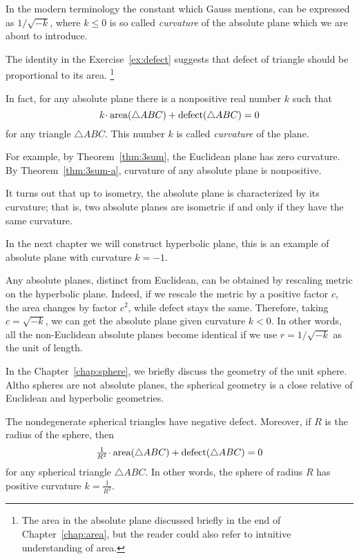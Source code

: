 In the modern terminology the constant which Gauss mentions, 
can be expressed as $1/\sqrt{-k}$, 
where $k\le 0$ is so called \emph{curvature} of the absolute plane which we are about to introduce.

The identity in the Exercise~\ref{ex:defect}
suggests that defect of triangle 
should be proportional to its area.%
\footnote{The area in the absolute plane discussed briefly in the end of Chapter~\ref{chap:area},
but the reader could also refer to intuitive understanding of area.}

In fact, for any absolute plane there is a nonpositive real number $k$
such that 
$$k\cdot\area(\triangle ABC)+\defect(\triangle ABC)=0$$
for any triangle $\triangle ABC$.
This number $k$ is called \emph{curvature} of the plane.

For example, by Theorem~\ref{thm:3sum}, the Euclidean plane has zero curvature.
By Theorem~\ref{thm:3sum-a}, curvature of any absolute plane is nonpositive.

It turns out that up to isometry, the absolute plane is characterized by its curvature;
that is, two absolute planes are isometric if and only if they have the same curvature. 



In the next chapter we will construct hyperbolic plane,
this is an example of absolute plane with curvature $k=-1$.

Any absolute planes, distinct from Euclidean,
can be obtained by rescaling metric on the hyperbolic plane.
Indeed,
if we rescale the metric by a positive factor $c$,
the area changes by factor $c^2$, 
while defect stays the same.
Therefore, taking $c=\sqrt{-k}$,
we can get the absolute plane given curvature $k<0$.
In other words, all the non-Euclidean absolute planes become identical
if we use $r=1/\sqrt{-k}$ as the unit of length.

\medskip

In the Chapter~\ref{chap:sphere},
we briefly discuss the geometry of the unit sphere.
Altho spheres are not absolute planes,
the spherical geometry is a close relative of Euclidean and hyperbolic geometries.

The nondegenerate spherical triangles have negative defect.
Moreover, 
if $R$ is the radius of the sphere, then 
$$\tfrac1{R^2}\cdot\area(\triangle ABC)+\defect(\triangle ABC)=0$$
for any spherical triangle $\triangle ABC$.
In other words, 
the sphere of radius $R$ has positive curvature $k=\tfrac1{R^2}$.


